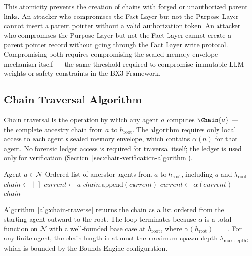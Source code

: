 This atomicity prevents the creation of chains with forged or unauthorized parent links. An attacker who compromises the Fact Layer but not the Purpose Layer cannot insert a parent pointer without a valid authorization token. An attacker who compromises the Purpose Layer but not the Fact Layer cannot create a parent pointer record without going through the Fact Layer write protocol. Compromising both requires compromising the sealed memory envelope mechanism itself — the same threshold required to compromise immutable LLM weights or safety constraints in the BX3 Framework.

\subsection{Chain Traversal Algorithm}
\label{sec:chain-traversal-algorithm}

Chain traversal is the operation by which any agent $a$ computes $\Chain{a}$ — the complete ancestry chain from $a$ to $h_{\text{root}}$. The algorithm requires only local access to each agent's sealed memory envelope, which contains $\alpha(n)$ for that agent. No forensic ledger access is required for traversal itself; the ledger is used only for verification (Section~\ref{sec:chain-verification-algorithm}).

\bigskip
\begin{algorithm}[H]
\caption{Chain-Traverse$(a)$}
\label{alg:chain-traverse}
\begin{algorithmic}[1]
\Require Agent $a \in \mathcal{N}$
\Ensure Ordered list of ancestor agents from $a$ to $h_{\text{root}}$, including $a$ and $h_{\text{root}}$
\State $chain \leftarrow [\,]$ 
\State $current \leftarrow a$
    \State $chain.\text{append}(current)$
    \State $current \leftarrow \alpha(current)$ 
\EndWhile
\State \Return $chain$
\end{algorithmic}
\end{algorithm}

\medskip

Algorithm~\ref{alg:chain-traverse} returns the chain as a list ordered from the starting agent outward to the root. The loop terminates because $\alpha$ is a total function on $\mathcal{N}$ with a well-founded base case at $h_{\text{root}}$, where $\alpha(h_{\text{root}}) = \bot$. For any finite agent, the chain length is at most the maximum spawn depth $\lambda_{\text{max\_depth}}$, which is bounded by the Bounds Engine configuration.

